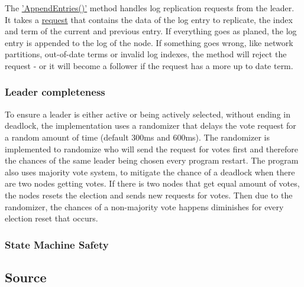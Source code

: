 \documentclass[a4paper,11pt]{article}
\begin{document}
The \href{https://github.com/jmsadair/raft/blob/dev/raft.go#L797}{'AppendEntries()'} method handles log replication requests from the leader. It takes a \href{https://github.com/jmsadair/raft/blob/c7c645603a7a495d858771f1e91f8b5a76cd798d/internal/protobuf/raft.proto#L17}{request} that contains the data of the log entry to replicate, the index and term of the current and previous entry.
If everything goes as planed, the log entry is appended to the log of the node.
If something goes wrong, like network partitions, out-of-date terms or invalid log indexes, the method will reject the request - or it will become a follower if the request has a more up to date term.
\subsubsection*{Leader completeness}
To ensure a leader is either active or being actively selected, without ending in deadlock, the implementation uses a randomizer that delays the vote request for a random amount of time (default 300ms and 600ms).
The randomizer is implemented to randomize who will send the request for votes first and therefore the chances of the same leader being chosen every program restart. The program also uses majority vote system,
to mitigate the chance of a deadlock when there are two nodes getting votes. If there is two nodes that get equal amount of votes, the nodes resets the election and sends new requests for votes.
Then due to the randomizer, the chances of a non-majority vote happens diminishes for every election reset that occurs.

\subsubsection*{State Machine Safety}

\subsection*{Source}
\end{document}

